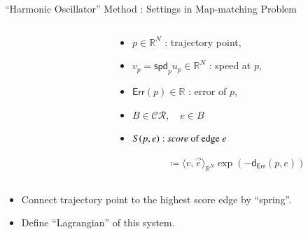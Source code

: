 \documentclass[aspectratio=169, bigfiles]{beamer}
\newcommand{\derr}{\mathsf{d}_{\mathsf{Err}}}
\newcommand{\CR}{\mathcal{CR}}
\newcommand{\err}{\mathsf{Err}}
\newcommand{\R}{\mathbb{R}}
\newcommand{\spd}{\mathsf{spd}}
\def\:={\coloneqq} %
\begin{document}
\begin{frame}{``Harmonic Oscillator'' Method : Settings in Map-matching Problem}
\begin{columns}[t]
\begin{column}{0.5\textwidth}
\begin{small}
\begin{tikzpicture}
\end{tikzpicture}
\end{small}
\end{column}
\begin{column}{0.5\textwidth} 
\vspace{-3mm}
    \begin{itemize}
        \item
        $p\in\R^{N}$ : trajectory point,
        \item
        $v_{p}=\spd_{p}u_{p}\in\R^{N}$ : speed at $p$,
        \item
        $\err(p)\in\R$ : error of $p$,
        \item
        $B\in\CR, \quad e\in B$
        \vspace{3mm}
        \item
        $S(p,e) : \text{\emph{score} of edge $e$}$
    \end{itemize}
    \vspace{-3mm}
        \begin{align*}
            \:= \langle v,\vec{e}\rangle_{\R^{N}}\exp{\left(-\derr(p,e)\right)}%
        \end{align*}
\end{column}
\end{columns}
\vspace{-4mm}
\begin{tcolorbox}[colframe=yellow,
colback=yellow!10!white,
colbacktitle=yellow!40!white,
coltitle=black, fonttitle=\bfseries]
    \begin{itemize}
        \item
        Connect trajectory point to the highest score edge by ``spring''.
        \item
        Define ``Lagrangian'' of this system.
    \end{itemize}
\end{tcolorbox}
\end{frame}
\end{document}
